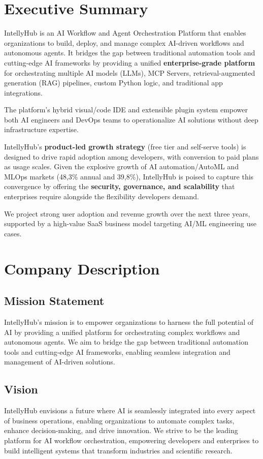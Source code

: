 \tableofcontents
\newpage


\section{Executive Summary}
IntellyHub is an AI Workflow and Agent Orchestration Platform that enables organizations to build, deploy, and manage complex AI-driven workflows and autonomous agents. It bridges the gap between traditional automation tools and cutting-edge AI frameworks by providing a unified \textbf{enterprise-grade platform} for orchestrating multiple AI models (LLMs), MCP Servers, retrieval-aug\-ment\-ed generation (RAG) pipelines, custom Python logic, and traditional app integrations. 

The platform's hybrid visual/code IDE and extensible plugin system empower both AI engineers and DevOps teams to operationalize AI solutions without deep infrastructure expertise. 

IntellyHub's \textbf{product-led growth strategy} (free tier and self-serve tools) is designed to drive rapid adoption among developers, with conversion to paid plans as usage scales. Given the explosive growth of AI automation/AutoML and MLOps markets (48,3\% annual\cite{AIMarket} and 39,8\%\cite{MLOpsMarket}), IntellyHub is poised to capture this convergence by offering the \textbf{security, governance, and scalability} that enterprises require alongside the flexibility developers demand.

We project strong user adoption and revenue growth over the next three years, supported by a high-value SaaS business model targeting AI/ML engineering use cases.

\section{Company Description}
\subsection{Mission Statement}
IntellyHub's mission is to empower organizations to harness the full potential of AI by providing a unified platform for orchestrating complex workflows and autonomous agents. We aim to bridge the gap between traditional automation tools and cutting-edge AI frameworks, enabling seamless integration and management of AI-driven solutions.

\subsection{Vision}
IntellyHub envisions a future where AI is seamlessly integrated into every aspect of business operations, enabling organizations to automate complex tasks, enhance decision-making, and drive innovation. We strive to be the leading platform for AI workflow orchestration, empowering developers and enterprises to build intelligent systems that transform industries and scientific research.

